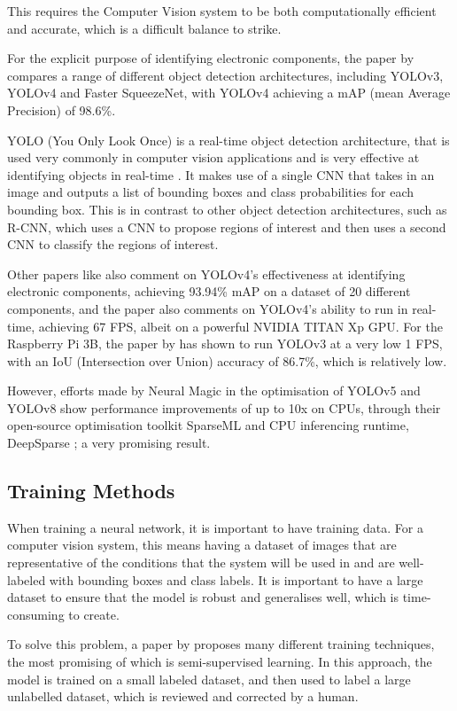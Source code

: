 This requires the Computer Vision system to be both computationally efficient and accurate, which is a difficult balance to strike.

For the explicit purpose of identifying electronic components, the paper by \citet{s22239079} compares a range of different object detection architectures, including YOLOv3, YOLOv4 and Faster SqueezeNet, with YOLOv4 achieving a mAP (mean Average Precision) of 98.6\%.

YOLO (You Only Look Once) is a real-time object detection architecture, that is used very commonly in computer vision applications and is very effective at identifying objects in real-time \citet{yolo}. It makes
use of a single CNN that takes in an image and outputs a list of bounding boxes and class probabilities for each bounding box. This is in contrast to other object detection architectures, such as R-CNN, which uses a CNN to propose regions of interest and then uses a second CNN to classify the regions of interest.

Other papers like \citet{Guo2021} also comment on YOLOv4's effectiveness at identifying electronic components, achieving 93.94\% mAP on a dataset of 20 different components, and the paper also comments
on YOLOv4's ability to run in real-time, achieving 67 FPS, albeit on a powerful NVIDIA TITAN Xp GPU. For the Raspberry Pi 3B, the paper by \citet{9166199} has shown to run YOLOv3 at a very low 1 FPS,
with an IoU (Intersection over Union) accuracy of 86.7\%, which is relatively low.

However, efforts made by Neural Magic \cite{neuralmagic} in the optimisation of YOLOv5 and YOLOv8 show performance improvements of up to 10x on CPUs, through their open-source optimisation toolkit SparseML \cite{sparseml} and CPU inferencing runtime, DeepSparse \cite{deepsparse}; a very promising result.

\subsection{Training Methods}
When training a neural network, it is important to have training data. For a computer vision system, this means having a dataset of images that are representative of the conditions that the system will be used in and are well-labeled with bounding boxes and class labels. It is important to have a large dataset to ensure that the model is robust and generalises well, which is time-consuming to create.

To solve this problem, a paper by \citet{Yang_2023} proposes many different training techniques, the most promising of which is semi-supervised learning. In this approach, the model is trained on a small labeled dataset, and then used to label a large unlabelled dataset, which is reviewed and corrected by a human.


